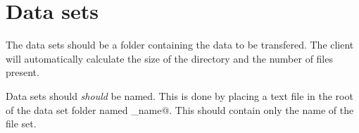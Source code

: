 \section{Data sets}
The data sets should be a folder containing the data to be transfered. The
client will automatically calculate the size of the directory and the number of
files present. 

Data sets should \textit{should} be named. This is done by placing a text file
in the root of the data set folder named \verb@fs_name@. This should contain
only the name of the file set.
